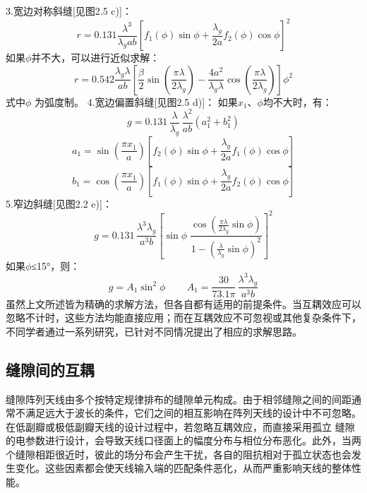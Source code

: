     3.宽边对称斜缝[见图2.5 c)]：
\begin{equation}
    r = 0.131 \frac{\lambda^3}{\lambda_g ab} \left[ f_1(\phi) \sin \phi + \frac{\lambda_g}{2a} f_2(\phi) \cos \phi\right]^2 
\end{equation}
    如果$\phi$并不大，可以进行近似求解：
\begin{equation}
    r = 0.542 \frac{\lambda_g \lambda}{ab} \left[ \frac{\beta}{2} \sin\left(\frac{\pi \lambda}{2\lambda_g}\right) - \frac{4a^2}{\lambda_g \lambda} \cos\left(\frac{\pi \lambda}{2\lambda_g}\right) \right] \phi^2
\end{equation}
    式中$\phi$ 为弧度制。
    4.宽边偏置斜缝[见图2.5 d)]：
    如果$x_1$、$\phi$均不大时，有：
\begin{equation}
    g = 0.131 \,\frac{\lambda}{\lambda_g}\,\frac{\lambda^2}{ab}\left(a_1^2 + b_1^2\right)
\end{equation}
\begin{equation}
    a_1 = \sin\left(\frac{\pi x_1}{a}\right)
    \left[
    f_2(\phi)\sin\phi+\frac{\lambda_g}{2a} f_1(\phi)\cos\phi
    \right]
\end{equation}
\begin{equation}
    b_1 = \cos\left(\frac{\pi x_1}{a}\right)
    \left[
    f_1(\phi)\sin\phi+\frac{\lambda_g}{2a} f_2(\phi)\cos\phi
    \right]
\end{equation}
    5.窄边斜缝[见图2.2 e)]：
\begin{equation}
    g = 0.131 \,\frac{\lambda^3 \lambda_g}{a^3 b}
    \left[
    \sin\phi \;
    \frac{\cos\!\left(\frac{\pi\lambda}{2\lambda_g}\sin\phi\right)}
    {1-\left(\frac{\lambda}{\lambda_g}\sin\phi\right)^2}
    \right]^2
\end{equation}
    如果$\phi$≤15°，则：
\begin{equation}
    g = A_1 \sin^2\phi \, \qquad
    A_1 = \frac{30}{73.1 \pi}\,\frac{\lambda^3 \lambda_g}{a^3 b}
\end{equation}
    虽然上文所述皆为精确的求解方法，但各自都有适用的前提条件。当互耦效应可以忽略不计时，这些方法均能直接应用；而在互耦效应不可忽视或其他复杂条件下，不同学者通过一系列研究，已针对不同情况提出了相应的求解思路。



\subsection{缝隙间的互耦}
    缝隙阵列天线由多个按特定规律排布的缝隙单元构成。由于相邻缝隙之间的间距通常不满足远大于波长的条件，它们之间的相互影响在阵列天线的设计中不可忽略。在低副瓣或极低副瓣天线的设计过程中，若忽略互耦效应，而直接采用孤立
缝隙的电参数进行设计，会导致天线口径面上的幅度分布与相位分布恶化。此外，当两个缝隙相距很近时，彼此的场分布会产生干扰，各自的阻抗相对于孤立状态也会发生变化。这些因素都会使天线输入端的匹配条件恶化，从而严重影响天线的整体性能。

